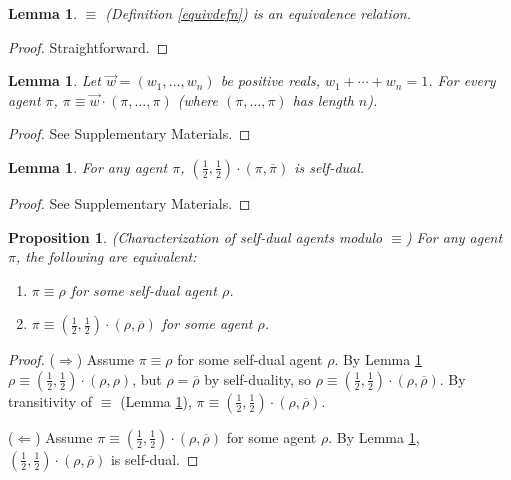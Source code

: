 \documentclass[twoside]{article}
\newtheorem{lemma}[theorem]{Lemma}
\newtheorem{proposition}[theorem]{Proposition}
\begin{document}
\begin{lemma}
\label{equivrelationlemma}
    $\equiv$ (Definition \ref{equivdefn}) is an equivalence
    relation.
\end{lemma}

\begin{proof}
    Straightforward.
\end{proof}

\begin{lemma}
\label{piopluspilemma}
    Let $\vec w=(w_1,\ldots,w_n)$ be positive reals,
    $w_1+\cdots+w_n=1$. For every agent $\pi$,
    $\pi\equiv\vec w\cdot (\pi,\ldots,\pi)$ (where
    $(\pi,\ldots,\pi)$ has length $n$).
\end{lemma}

\begin{proof}
    See Supplementary Materials.
\end{proof}

\begin{lemma}
\label{reflectionmakesjanuslemma}
    For any agent $\pi$,
    $(\frac12,\frac12)\cdot(\pi,\overline\pi)$ is self-dual.
\end{lemma}

\begin{proof}
    See Supplementary Materials.
\end{proof}

\begin{proposition}
\label{janusagentcharacterizationproposition}
    (Characterization of self-dual agents modulo $\equiv$)
    For any agent $\pi$, the following are equivalent:
    \begin{enumerate}
        \item $\pi\equiv\rho$ for some self-dual agent $\rho$.
        \item $\pi\equiv(\frac12,\frac12)\cdot(\rho,\overline{\rho})$
            for some agent $\rho$.
    \end{enumerate}
\end{proposition}

\begin{proof}
    ($\Rightarrow$)
    Assume $\pi\equiv\rho$ for some self-dual agent $\rho$.
    By Lemma \ref{piopluspilemma}
    $\rho\equiv (\frac12,\frac12)\cdot(\rho,\rho)$,
    but $\rho=\overline{\rho}$ by self-duality,
    so
    $\rho\equiv (\frac12,\frac12)\cdot(\rho,\overline{\rho})$.
    By transitivity of $\equiv$ (Lemma \ref{equivrelationlemma}),
    $\pi\equiv(\frac12,\frac12)\cdot(\rho,\overline{\rho})$.

    ($\Leftarrow$)
    Assume $\pi\equiv(\frac12,\frac12)\cdot(\rho,\overline{\rho})$ for some agent $\rho$.
    By Lemma \ref{reflectionmakesjanuslemma},
    $(\frac12,\frac12)\cdot(\rho,\overline{\rho})$ is self-dual.
\end{proof}
\end{document}
